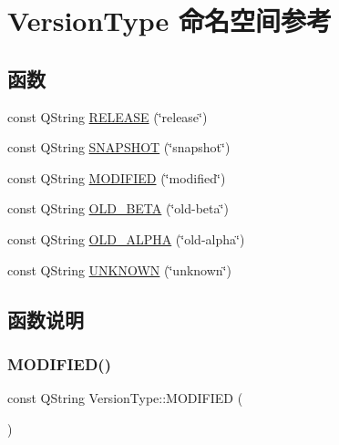 \hypertarget{namespace_version_type}{}\section{Version\+Type 命名空间参考}
\label{namespace_version_type}
\subsection*{函数}
\begin{DoxyCompactItemize}
\item 
const Q\+String \mbox{\hyperlink{namespace_version_type_a5fda5c8e9de9461a33bb7ce3962a2f42}{R\+E\+L\+E\+A\+SE}} (\char`\"{}release\char`\"{})
\item 
const Q\+String \mbox{\hyperlink{namespace_version_type_adf5d7066e09caeb018f0409e76fa24f0}{S\+N\+A\+P\+S\+H\+OT}} (\char`\"{}snapshot\char`\"{})
\item 
const Q\+String \mbox{\hyperlink{namespace_version_type_adceba6eeeb36abb48672b0718c415e44}{M\+O\+D\+I\+F\+I\+ED}} (\char`\"{}modified\char`\"{})
\item 
const Q\+String \mbox{\hyperlink{namespace_version_type_ac50fcdb4391356ab7d702dfa85e76fe9}{O\+L\+D\+\_\+\+B\+E\+TA}} (\char`\"{}old-\/beta\char`\"{})
\item 
const Q\+String \mbox{\hyperlink{namespace_version_type_ade9bf0a7a72577da7d6885b4fff171aa}{O\+L\+D\+\_\+\+A\+L\+P\+HA}} (\char`\"{}old-\/alpha\char`\"{})
\item 
const Q\+String \mbox{\hyperlink{namespace_version_type_a3142e7d918513088ad8471f964ef5099}{U\+N\+K\+N\+O\+WN}} (\char`\"{}unknown\char`\"{})
\end{DoxyCompactItemize}


\subsection{函数说明}
\mbox{\label{namespace_version_type_adceba6eeeb36abb48672b0718c415e44}} 
\subsubsection{\texorpdfstring{M\+O\+D\+I\+F\+I\+E\+D()}{MODIFIED()}}
{\footnotesize\ttfamily const Q\+String Version\+Type\+::\+M\+O\+D\+I\+F\+I\+ED (\begin{DoxyParamCaption}\item[{\char`\"{}modified\char`\"{}}]{ }\end{DoxyParamCaption})}

